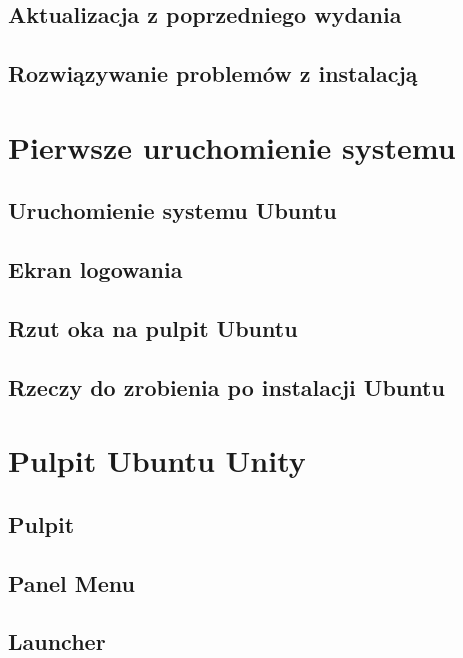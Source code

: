 \documentclass[a4paper,11pt,oneside]{mwart}
\begin{document}
		\subsection{Aktualizacja z poprzedniego wydania}
		\subsection{Rozwiązywanie problemów z instalacją}
			
	\section{Pierwsze uruchomienie systemu}
		\subsection{Uruchomienie systemu Ubuntu}
			
		\subsection{Ekran logowania}
			
		\subsection{Rzut oka na pulpit Ubuntu}
			
		\subsection{Rzeczy do zrobienia po instalacji Ubuntu}
			
	\section{Pulpit Ubuntu Unity}
	\label{pulpit_unity}
		\subsection{Pulpit}
			 
		\subsection{Panel Menu}
			
		\subsection{Launcher}
			
\end{document}
